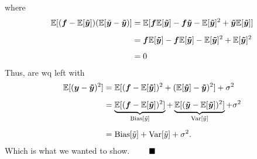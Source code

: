 \documentclass[12pt,
               a4paper,
               article,
               oneside,
               norsk,oldfontcommands]{memoir}
\newcommand{\Q}{ \qquad \hfill \blacksquare}
\begin{document}
where
\begin{equation}
    \begin{aligned}
        \mathbb{E}[(\bm{f}- \mathbb{E}[\bm{\tilde{y}}])( \mathbb{E}[\tilde{\bm{y}} -\bm{\Tilde{y}})] &= \mathbb{E}[\bm{f}\mathbb{E}[\bm{\tilde{y}}] - \bm{f\Tilde{y}} - \mathbb{E}[\bm{\tilde{y}}]^2 + \bm{\Tilde{y}}\mathbb{E}[\bm{\tilde{y}}]]\\[5pt]
        &= \bm{f}\mathbb{E}[\bm{\tilde{y}}] - \bm{f}\mathbb{E}[\bm{\tilde{y}}] - \mathbb{E}[\bm{\tilde{y}}]^2 + \mathbb{E}[\bm{\tilde{y}}]^2\\[5pt]
        &= 0
    \end{aligned}
\end{equation}
Thus, are wq left with
\begin{align*}
         \mathbb{E}[(\bm{y}-\bm{\tilde{y}})^2] &= \mathbb{E}[(\bm{f}- \mathbb{E}[\bm{\tilde{y}}])^2 + (\mathbb{E}[\bm{\tilde{y}}]-\bm{\Tilde{y}})^2] + \sigma^2\\[5pt]
         &= \underbrace{\mathbb{E}[(\bm{f}- \mathbb{E}[\bm{\tilde{y}}])^2]}_{\text{Bias}[\tilde{y}]} + \underbrace{\mathbb{E}[(\bm{\Tilde{y}}-\mathbb{E}[\bm{\tilde{y}}])^2]}_{\text{Var}[\tilde{y}]} + \sigma^2\\[5pt]
         &= \text{Bias}[\tilde{y}] + \text{Var}[\tilde{y}] + \sigma^2.
\end{align*}
Which is what we wanted to show. $\Q$
\end{document}
